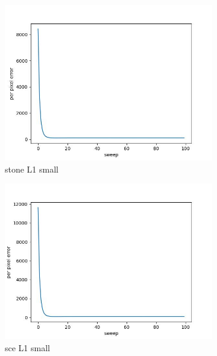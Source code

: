 \documentclass[11pt]{article}
\begin{document}
\begin{figure}[ht!]
    \centering
    \hfill%
    \begin{subfigure}[]{0.333\linewidth}
        \centering
        \includegraphics[width=\linewidth]{fig/loss/stone_L1_small_loss.jpg}
        \caption{stone L1 small}
    \end{subfigure}%
    \hfill%
    \begin{subfigure}[]{0.333\linewidth}
        \centering
        \includegraphics[width=\linewidth]{fig/loss/sce_L1_small_loss.jpg}
        \caption{sce L1 small}
    \end{subfigure}%
    \hfill%
    \begin{subfigure}[]{0.333\linewidth}
        \centering

\end{subfigure}
\end{figure}
\end{document}
